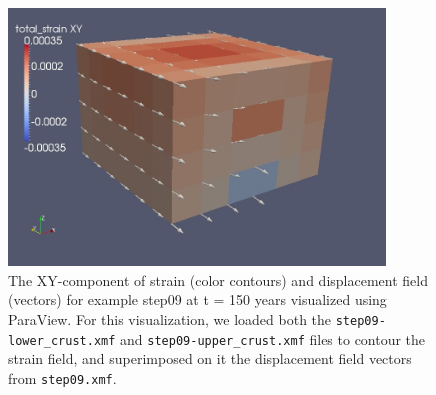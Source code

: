 \begin{figure}
\centering{}\includegraphics[width=10cm]{tutorials/3dhex8/figs/step08-strain-displ-t150}\caption{The XY-component of strain (color contours) and displacement field
(vectors) for example step09 at t = 150 years visualized using ParaView.
For this visualization, we loaded both the \texttt{step09-lower\_crust.xmf}
and \texttt{step09-upper\_crust.xmf} files to contour the strain field,
and superimposed on it the displacement field vectors from \texttt{step09.xmf}.\label{fig:step09-strain-displ-t150}}
\end{figure}

